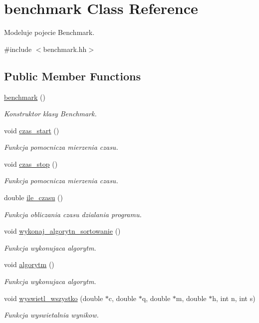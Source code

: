 \hypertarget{classbenchmark}{\section{benchmark Class Reference}
\label{classbenchmark}
}


Modeluje pojecie Benchmark.  




{\ttfamily \#include $<$benchmark.\-hh$>$}

\subsection*{Public Member Functions}
\begin{DoxyCompactItemize}
\item 
\hyperlink{classbenchmark_af56f1d9420c5c1ccc65e4f6aac54658d}{benchmark} ()
\begin{DoxyCompactList}\small\item\em Konstruktor klasy Benchmark. \end{DoxyCompactList}\item 
void \hyperlink{classbenchmark_a42ab532c49030406366e859f9b3f29f8}{czas\-\_\-start} ()
\begin{DoxyCompactList}\small\item\em Funkcja pomocnicza mierzenia czasu. \end{DoxyCompactList}\item 
void \hyperlink{classbenchmark_a9beb25d3e65b94c1ac7c085d8105fe65}{czas\-\_\-stop} ()
\begin{DoxyCompactList}\small\item\em Funkcja pomocnicza mierzenia czasu. \end{DoxyCompactList}\item 
double \hyperlink{classbenchmark_a613a8792feca7c2622355922d64d6fcd}{ile\-\_\-czasu} ()
\begin{DoxyCompactList}\small\item\em Funkcja obliczania czasu dzialania programu. \end{DoxyCompactList}\item 
void \hyperlink{classbenchmark_a845da6947383df74d871e273bf225721}{wykonaj\-\_\-algorytn\-\_\-sortowanie} ()
\begin{DoxyCompactList}\small\item\em Funkcja wykonujaca algorytm. \end{DoxyCompactList}\item 
void \hyperlink{classbenchmark_aedc5a477317912eb0d9ca5f9f1da3b7c}{algorytm} ()
\begin{DoxyCompactList}\small\item\em Funkcja wykonujaca algorytm. \end{DoxyCompactList}\item 
void \hyperlink{classbenchmark_a45a6a3fcaf8d09f172f2776451d67c9b}{wyswietl\-\_\-wszystko} (double $\ast$c, double $\ast$q, double $\ast$m, double $\ast$h, int n, int s)
\begin{DoxyCompactList}\small\item\em Funkcja wyswietalnia wynikow. \end{DoxyCompactList}\end{DoxyCompactItemize}

